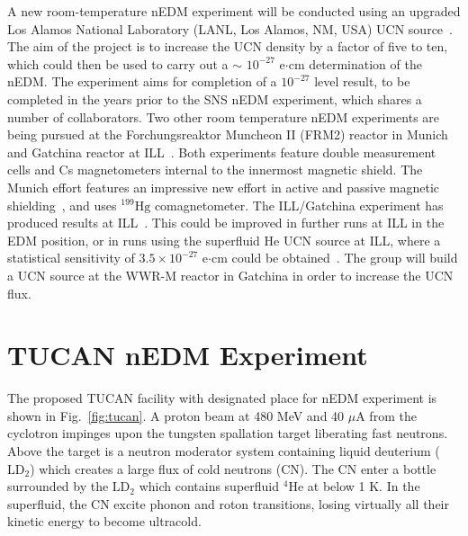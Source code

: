 A new room-temperature nEDM experiment will be conducted using an upgraded
Los Alamos National Laboratory (LANL, Los Alamos, NM, USA) UCN source~\cite{lanl_nEDM-workshop}. The aim of the project is to increase the UCN density by a factor of five to ten, which could then be used to carry out a $\sim$ $10^{-27}$ e$\cdot$cm determination of the nEDM. The experiment aims for completion of a $10^{-27}$ level result, to be completed in the years prior to the SNS nEDM experiment, which shares a number of collaborators. Two other room temperature nEDM experiments are being pursued at the Forchungsreaktor Muncheon II (FRM2) reactor in Munich~\cite{frm2} and Gatchina reactor at ILL~\cite{PNPI}. Both experiments feature double measurement cells and Cs magnetometers internal to the innermost magnetic shield. The Munich effort features an impressive new effort in active and passive magnetic shielding~\cite{msr_design,shield_pnpi,shield_pnpi2}, and uses $^{199}\mathrm{Hg}$ comagnetometer. The ILL/Gatchina experiment has produced results at ILL~\cite{PNPI}. This could be improved in further runs at ILL in the EDM position, or in runs using the superfluid He UCN source at ILL, where a statistical sensitivity of $3.5 \times 10^{-27}$ e$\cdot$cm could be obtained~\cite{pnpi_nEDM-workshop}. The group will build a UCN source at the WWR-M reactor in Gatchina in order to increase the UCN flux.

\section{TUCAN nEDM Experiment}



The proposed TUCAN facility with designated place for nEDM experiment is shown in Fig.~\ref{fig:tucan}. A proton beam at 480 MeV and 40 $\mu$A from the cyclotron impinges upon the tungsten spallation target liberating fast neutrons. Above the target is a neutron moderator system containing liquid deuterium ($\mathrm{LD_2}$) which creates a large flux of cold neutrons (CN). The CN enter a bottle surrounded by the $\mathrm{LD_2}$ which contains superfluid $^4\mathrm{He}$ at below 1 K. In the superfluid, the CN excite phonon and roton transitions, losing virtually all their kinetic energy to become ultracold. 

